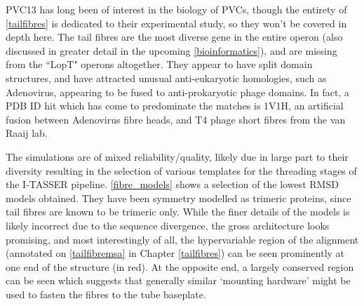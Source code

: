 PVC13 has long been of interest in the biology of PVCs, though the entirety of \vref{tailfibres} is dedicated to their experimental study, so they won't be covered in depth here. The tail fibres are the most diverse gene in the entire operon (also discussed in greater detail in the upcoming \ref{bioinformatics}), and are missing from the ``LopT" operons altogether. They appear to have split domain structures, and have attracted unusual anti-eukaryotic homologies, such as Adenovirus, appearing to be fused to anti-prokaryotic phage domains. In fact, a PDB ID hit which has come to predominate the matches is 1V1H, an artificial fusion between Adenovirus fibre heads, and T4 phage short fibres from the van Raaij lab\citep{Papanikolopoulou2004}.

The simulations are of mixed reliability/quality, likely due in large part to their diversity resulting in the selection of various templates for the threading stages of the I-TASSER pipeline. \vref{fibre_models} shows a selection of the lowest RMSD models obtained. They have been symmetry modelled as trimeric proteins, since tail fibres are known to be trimeric only. While the finer details of the models is likely incorrect due to the sequence divergence, the gross architecture looks promising, and most interestingly of all, the hypervariable region of the alignment (annotated on \vref{tailfibremsa} in Chapter \ref{tailfibres}) can be seen prominently at one end of the structure (in red). At the opposite end, a largely conserved region can be seen which suggests that generally similar `mounting hardware' might be used to fasten the fibres to the tube baseplate.

